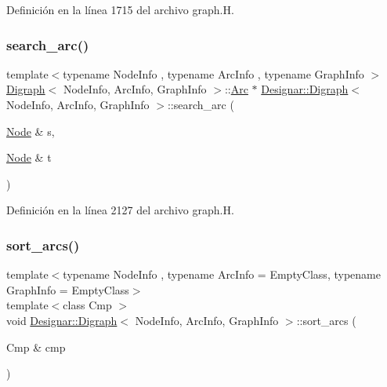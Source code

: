 Definición en la línea 1715 del archivo graph.\+H.

\mbox{\label{class_designar_1_1_digraph_ac301ebe5d45b2864639d68d7e9aeea2a}} 
\subsubsection{\texorpdfstring{search\+\_\+arc()}{search\_arc()}}
{\footnotesize\ttfamily template$<$typename Node\+Info , typename Arc\+Info , typename Graph\+Info $>$ \\
\hyperlink{class_designar_1_1_digraph}{Digraph}$<$ Node\+Info, Arc\+Info, Graph\+Info $>$\+::\hyperlink{class_designar_1_1_digraph_a0ceb278671f2a535c00fddccdeafd69f}{Arc} $\ast$ \hyperlink{class_designar_1_1_digraph}{Designar\+::\+Digraph}$<$ Node\+Info, Arc\+Info, Graph\+Info $>$\+::search\+\_\+arc (\begin{DoxyParamCaption}\item[{\hyperlink{class_designar_1_1_digraph_a4dc921c41a480b7946a04170e997d8ae}{Node} \&}]{s,  }\item[{\hyperlink{class_designar_1_1_digraph_a4dc921c41a480b7946a04170e997d8ae}{Node} \&}]{t }\end{DoxyParamCaption})}



Definición en la línea 2127 del archivo graph.\+H.

\mbox{\label{class_designar_1_1_digraph_a450085493969a382371f7d4d407e42cd}} 
\subsubsection{\texorpdfstring{sort\+\_\+arcs()}{sort\_arcs()}\hspace{0.1cm}{\footnotesize\ttfamily [1/2]}}
{\footnotesize\ttfamily template$<$typename Node\+Info , typename Arc\+Info  = Empty\+Class, typename Graph\+Info  = Empty\+Class$>$ \\
template$<$class Cmp $>$ \\
void \hyperlink{class_designar_1_1_digraph}{Designar\+::\+Digraph}$<$ Node\+Info, Arc\+Info, Graph\+Info $>$\+::sort\+\_\+arcs (\begin{DoxyParamCaption}\item[{Cmp \&}]{cmp }\end{DoxyParamCaption})\hspace{0.3cm}{\ttfamily [inline]}}



